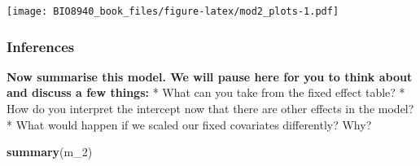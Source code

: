 \documentclass[
  12pt,
]{book}
\newenvironment{Shaded}{\begin{snugshade}}{\end{snugshade}}
\newcommand{\CommentTok}[1]{\textcolor[rgb]{0.56,0.35,0.01}{\textit{#1}}}
\newcommand{\DataTypeTok}[1]{\textcolor[rgb]{0.13,0.29,0.53}{#1}}
\newcommand{\DecValTok}[1]{\textcolor[rgb]{0.00,0.00,0.81}{#1}}
\newcommand{\FloatTok}[1]{\textcolor[rgb]{0.00,0.00,0.81}{#1}}
\newcommand{\KeywordTok}[1]{\textcolor[rgb]{0.13,0.29,0.53}{\textbf{#1}}}
\newcommand{\NormalTok}[1]{#1}
\newcommand{\OperatorTok}[1]{\textcolor[rgb]{0.81,0.36,0.00}{\textbf{#1}}}
\newcommand{\StringTok}[1]{\textcolor[rgb]{0.31,0.60,0.02}{#1}}
\begin{document}
\begin{Shaded}
\end{Shaded}

\texttt{[image: BIO8940\_book\_files/figure-latex/mod2\_plots-1.pdf]}

\hypertarget{inferences}{%
\subsubsection{Inferences}\label{inferences}}

\textbf{Now summarise this model. We will pause here for you to think about and discuss a few things:}
* What can you take from the fixed effect table?
* How do you interpret the intercept now that there are other effects in the model?
* What would happen if we scaled our fixed covariates differently? Why?

\begin{Shaded}
\begin{Highlighting}[]
\KeywordTok{summary}\NormalTok{(m_}\DecValTok{2}\NormalTok{)}
\end{Highlighting}
\end{Shaded}
\end{document}
